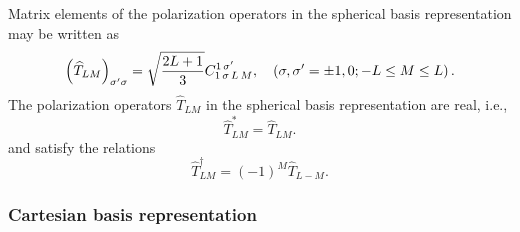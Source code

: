 Matrix elements of the polarization operators in the spherical basis representation may be written as
\begin{equation}
\left(\widehat{T}_{L M}\right)_{\sigma^{\prime} \sigma}=\sqrt{\frac{2 L+1}{3}} C_{1\,\sigma\,L\,M}^{1\,\sigma^{\prime}}, \quad\left(\sigma, \sigma^{\prime}= \pm 1,0 ;-L \leq M \leq L\right) .\label{eq:2:6:20}
\end{equation}
The polarization operators $\widehat{T}_{L M}$ in the spherical basis representation are real, i.e.,
\begin{equation}
\widehat{T}_{L M}^{*}=\widehat{T}_{L M}. \label{eq:2:6:21}
\end{equation}
and satisfy the relations
\begin{equation}
\hat{T}_{L M}^{\dagger}=(-1)^{M} \hat{T}_{L-M} .\label{eq:2:6:22}
\end{equation}
\subsubsection{Cartesian basis representation}

